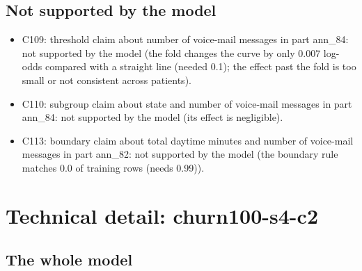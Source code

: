 \documentclass[a4paper,10pt]{article}
\newif\ifreviewmarks
\newcommand{\reviewrule}{\noindent{\color{BrickRed}\rule{\linewidth}{0.8pt}}}
\newenvironment{drafted}[1][]{%
  \ifreviewmarks\par\addvspace{\medskipamount}\reviewrule\par\nopagebreak
  \noindent{\color{BrickRed}\sffamily\footnotesize\textbf{Thesis Draft}\quad #1\hfill review}\par\nopagebreak\smallskip\fi}{%
  \ifreviewmarks\par\smallskip\noindent{\color{BrickRed}\sffamily\footnotesize end of thesis draft}\par\nopagebreak\reviewrule\par\medskip\fi}
\begin{document}
\begin{drafted}[plain-language layer: churn100-s4-c2]
\subsection{Not supported by the model}
\begin{itemize}\setlength\itemsep{0pt}\small
\item C109: threshold claim about number of voice-mail messages in part ann\_\allowbreak{}84: not supported by the model (the fold changes the curve by only 0.007 log-odds compared with a straight line (needed 0.1); the effect past the fold is too small or not consistent across patients).
\item C110: subgroup claim about state and number of voice-mail messages in part ann\_\allowbreak{}84: not supported by the model (its effect is negligible).
\item C113: boundary claim about total daytime minutes and number of voice-mail messages in part ann\_\allowbreak{}82: not supported by the model (the boundary rule matches 0.0 of training rows (needs 0.99)).
\end{itemize}
\clearpage\section*{Technical detail: churn100-s4-c2}
\renewcommand{\thesubsection}{T.\arabic{subsection}}\setcounter{subsection}{0}
\subsection{The whole model}\label{tech:ann87}

\end{drafted}
\end{document}
